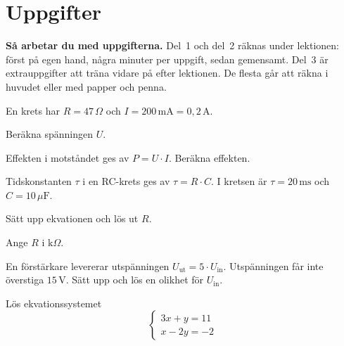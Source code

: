 
\section{Uppgifter}
\label{c4:sec:uppgifter}

\begin{aside}
\textbf{Så arbetar du med uppgifterna.} Del~1 och del~2 räknas under lektionen: först på egen
hand, några minuter per uppgift, sedan gemensamt. Del~3 är extrauppgifter att träna vidare på
efter lektionen. De flesta går att räkna i huvudet eller med papper och penna.

\end{aside}


En krets har $R = 47\,\Omega$ och $I = 200\,\text{mA} = 0{,}2\,\text{A}$.
\begin{parts}
  \item Beräkna spänningen $U$.
  \item Effekten i motståndet ges av $P = U \cdot I$. Beräkna effekten.
\end{parts}

Tidskonstanten $\tau$ i en RC-krets ges av $\tau = R \cdot C$. I kretsen är
$\tau = 20\,\text{ms}$ och $C = 10\,\mu\text{F}$.
\begin{parts}
  \item Sätt upp ekvationen och lös ut $R$.
  \item Ange $R$ i $\text{k}\Omega$.
\end{parts}

En förstärkare levererar utspänningen $U_{\text{ut}} = 5 \cdot U_{\text{in}}$. Utspänningen får
inte överstiga $15\,\text{V}$. Sätt upp och lös en olikhet för $U_{\text{in}}$.


Lös ekvationssystemet
\[
  \begin{cases}
    3x + y = 11 \\
    x - 2y = -2
  \end{cases}
\]


